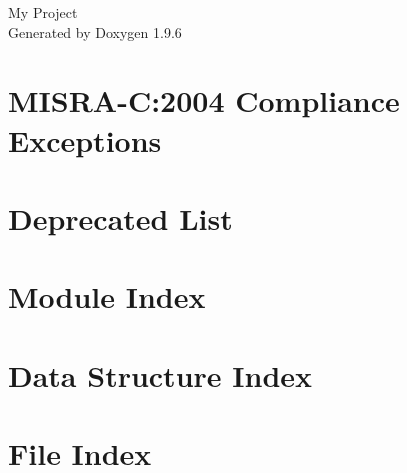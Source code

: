 \documentclass[twoside]{book}
\newcommand{\+}{\discretionary{\mbox{\scriptsize$\hookleftarrow$}}{}{}}
\newcommand{\clearemptydoublepage}{%
    \newpage{\pagestyle{empty}\cleardoublepage}%
  }
\begin{document}
  \raggedbottom
    \hypersetup{pageanchor=false,
                bookmarksnumbered=true,
                pdfencoding=unicode
               }
  \begin{titlepage}
  \vspace*{7cm}
  \begin{center}%
  {\Large My Project}\\
  \vspace*{1cm}
  {\large Generated by Doxygen 1.9.6}\\
  \end{center}
  \end{titlepage}
  \clearemptydoublepage
  \tableofcontents
  \clearemptydoublepage
  \hypersetup{pageanchor=true}
\chapter{MISRA-\/C\+:2004 Compliance Exceptions}
\label{_c_m_s_i_s__m_i_s_r_a__exceptions}

\chapter{Deprecated List}
\label{deprecated}

\chapter{Module Index}

\chapter{Data Structure Index}

\chapter{File Index}

\end{document}
